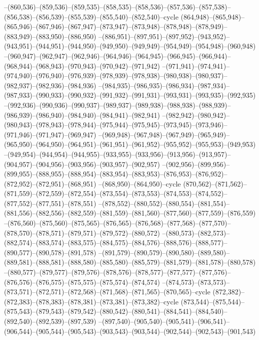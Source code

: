 --(860,536)--(859,536)--(859,535)--(858,535)--(858,536)--(857,536)--(857,538)--(856,538)--(856,539)--(855,539)--(855,540)--(852,540)--cycle
(864,948)--(865,948)--(865,946)--(867,946)--(867,947)--(873,947)--(873,948)--(878,948)--(878,949)--(883,949)--(883,950)--(886,950)
--(886,951)--(897,951)--(897,952)--(943,952)--(943,951)--(944,951)--(944,950)--(949,950)--(949,949)--(954,949)--(954,948)--(960,948)
--(960,947)--(962,947)--(962,946)--(964,946)--(964,945)--(966,945)--(966,944)--(968,944)--(968,943)--(970,943)--(970,942)--(971,942)
--(971,941)--(974,941)--(974,940)--(976,940)--(976,939)--(978,939)--(978,938)--(980,938)--(980,937)--(982,937)--(982,936)--(984,936)
--(984,935)--(986,935)--(986,934)--(987,934)--(987,933)--(990,933)--(990,932)--(991,932)--(991,931)--(993,931)--(993,935)--(992,935)
--(992,936)--(990,936)--(990,937)--(989,937)--(989,938)--(988,938)--(988,939)--(986,939)--(986,940)--(984,940)--(984,941)--(982,941)
--(982,942)--(980,942)--(980,943)--(978,943)--(978,944)--(975,944)--(975,945)--(973,945)--(973,946)--(971,946)--(971,947)--(969,947)
--(969,948)--(967,948)--(967,949)--(965,949)--(965,950)--(964,950)--(964,951)--(961,951)--(961,952)--(955,952)--(955,953)--(949,953)
--(949,954)--(944,954)--(944,955)--(933,955)--(933,956)--(913,956)--(913,957)--(904,957)--(904,956)--(903,956)--(903,957)--(902,957)
--(902,956)--(899,956)--(899,955)--(888,955)--(888,954)--(883,954)--(883,953)--(876,953)--(876,952)--(872,952)--(872,951)--(868,951)
--(868,950)--(864,950)--cycle
(870,562)--(871,562)--(871,559)--(872,559)--(872,554)--(873,554)--(873,553)--(874,553)--(874,552)--(877,552)--(877,551)--(878,551)
--(878,552)--(880,552)--(880,554)--(881,554)--(881,556)--(882,556)--(882,559)--(881,559)--(881,560)--(877,560)--(877,559)--(876,559)
--(876,560)--(875,560)--(875,565)--(876,565)--(876,568)--(877,568)--(877,570)--(878,570)--(878,571)--(879,571)--(879,572)--(880,572)
--(880,573)--(882,573)--(882,574)--(883,574)--(883,575)--(884,575)--(884,576)--(888,576)--(888,577)--(890,577)--(890,578)--(891,578)
--(891,579)--(890,579)--(890,580)--(889,580)--(889,581)--(888,581)--(888,580)--(885,580)--(885,579)--(881,579)--(881,578)--(880,578)
--(880,577)--(879,577)--(879,576)--(878,576)--(878,577)--(877,577)--(877,576)--(876,576)--(876,575)--(875,575)--(875,574)--(874,574)
--(874,573)--(873,573)--(873,571)--(872,571)--(872,568)--(871,568)--(871,565)--(870,565)--cycle
(872,382)--(872,383)--(878,383)--(878,381)--(873,381)--(873,382)--cycle
(873,544)--(875,544)--(875,543)--(879,543)--(879,542)--(880,542)--(880,541)--(884,541)--(884,540)--(892,540)--(892,539)--(897,539)
--(897,540)--(905,540)--(905,541)--(906,541)--(906,544)--(905,544)--(905,543)--(903,543)--(903,544)--(902,544)--(902,543)--(901,543)
